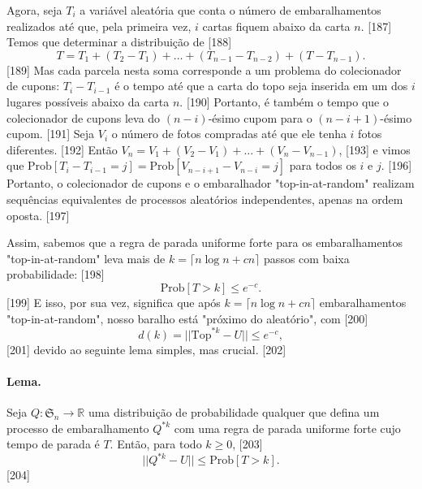 \documentclass[a4paper]{article}
\begin{document}
Agora, seja $T_i$ a variável aleatória que conta o número de embaralhamentos realizados até que, pela primeira vez, $i$ cartas fiquem abaixo da carta $n$. [187] Temos que determinar a distribuição de [188]
$$ T = T_1 + (T_2 - T_1) + \dots + (T_{n-1} - T_{n-2}) + (T - T_{n-1}). $$ [189]
Mas cada parcela nesta soma corresponde a um problema do colecionador de cupons: $T_i - T_{i-1}$ é o tempo até que a carta do topo seja inserida em um dos $i$ lugares possíveis abaixo da carta $n$. [190] Portanto, é também o tempo que o colecionador de cupons leva do $(n-i)$-ésimo cupom para o $(n-i+1)$-ésimo cupom. [191] Seja $V_i$ o número de fotos compradas até que ele tenha $i$ fotos diferentes. [192] Então
$V_n = V_1 + (V_2 - V_1) + \dots + (V_n - V_{n-1})$, [193] e vimos que $\text{Prob}[T_i - T_{i-1} = j] = \text{Prob}[V_{n-i+1} - V_{n-i} = j]$ para todos os $i$ e $j$. [196] Portanto, o colecionador de cupons e o embaralhador "top-in-at-random" realizam sequências equivalentes de processos aleatórios independentes, apenas na ordem oposta. [197]

Assim, sabemos que a regra de parada uniforme forte para os embaralhamentos "top-in-at-random" leva mais de $k = \lceil n \log n + cn \rceil$ passos com baixa probabilidade: [198]
$$ \text{Prob}[T > k] \le e^{-c}. $$ [199]
E isso, por sua vez, significa que após $k = \lceil n \log n + cn \rceil$ embaralhamentos "top-in-at-random", nosso baralho está "próximo do aleatório", com [200]
$$ d(k) = ||\text{Top}^{*k} - U|| \le e^{-c}, $$ [201]
devido ao seguinte lema simples, mas crucial. [202]

\paragraph{Lema.} Seja $Q: \mathfrak{S}_n \to \mathbb{R}$ uma distribuição de probabilidade qualquer que defina um processo de embaralhamento $Q^{*k}$ com uma regra de parada uniforme forte cujo tempo de parada é $T$. Então, para todo $k \ge 0$, [203]
$$ ||Q^{*k} - U|| \le \text{Prob}[T > k]. $$ [204]
\end{document}
